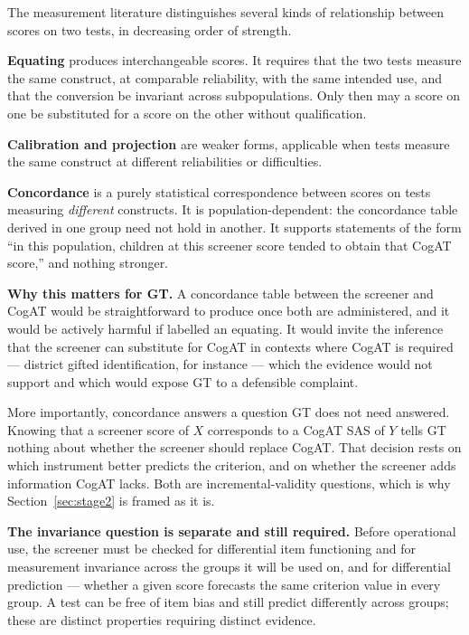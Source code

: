 The measurement literature distinguishes several kinds of relationship between
scores on two tests, in decreasing order of strength.

\textbf{Equating} produces interchangeable scores. It requires that the two
tests measure the same construct, at comparable reliability, with the same
intended use, and that the conversion be invariant across subpopulations. Only
then may a score on one be substituted for a score on the other without
qualification.

\textbf{Calibration and projection} are weaker forms, applicable when tests
measure the same construct at different reliabilities or difficulties.

\textbf{Concordance} is a purely statistical correspondence between scores on
tests measuring \emph{different} constructs. It is population-dependent: the
concordance table derived in one group need not hold in another. It supports
statements of the form ``in this population, children at this screener score
tended to obtain that CogAT score,'' and nothing stronger.

\textbf{Why this matters for GT.} A concordance table between the screener and
CogAT would be straightforward to produce once both are administered, and it
would be actively harmful if labelled an equating. It would invite the inference
that the screener can substitute for CogAT in contexts where CogAT is required
--- district gifted identification, for instance --- which the evidence would
not support and which would expose GT to a defensible complaint.

More importantly, concordance answers a question GT does not need answered.
Knowing that a screener score of $X$ corresponds to a CogAT SAS of $Y$ tells GT
nothing about whether the screener should replace CogAT. That decision rests on
which instrument better predicts the criterion, and on whether the screener adds
information CogAT lacks. Both are incremental-validity questions, which is why
Section~\ref{sec:stage2} is framed as it is.

\textbf{The invariance question is separate and still required.} Before
operational use, the screener must be checked for differential item functioning
and for measurement invariance across the groups it will be used on, and for
differential prediction --- whether a given score forecasts the same criterion
value in every group. A test can be free of item bias and still predict
differently across groups; these are distinct properties requiring distinct
evidence.

